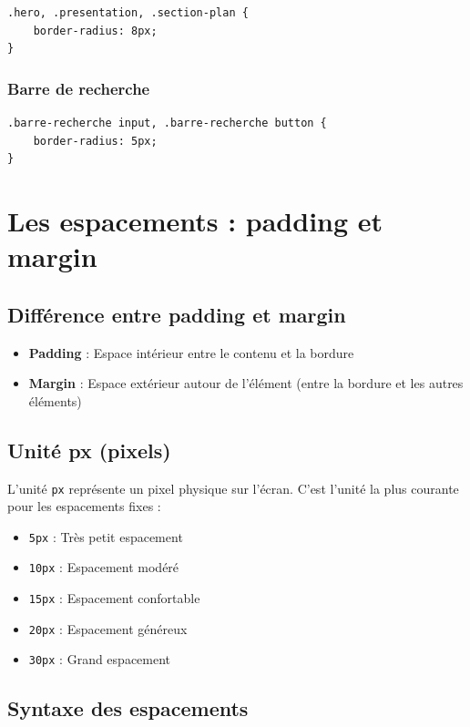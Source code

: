 \documentclass[12pt,a4paper]{article}
\begin{document}
\begin{lstlisting}[style=CSS]
.hero, .presentation, .section-plan {
    border-radius: 8px;
}
\end{lstlisting}

\subsubsection{Barre de recherche}

\begin{lstlisting}[style=CSS]
.barre-recherche input, .barre-recherche button {
    border-radius: 5px;
}
\end{lstlisting}

\section{Les espacements : padding et margin}

\subsection{Différence entre padding et margin}

\begin{itemize}
\item \textbf{Padding} : Espace intérieur entre le contenu et la bordure
\item \textbf{Margin} : Espace extérieur autour de l'élément (entre la bordure et les autres éléments)
\end{itemize}

\subsection{Unité px (pixels)}

L'unité \texttt{px} représente un pixel physique sur l'écran. C'est l'unité la plus courante pour les espacements fixes :

\begin{itemize}
\item \texttt{5px} : Très petit espacement
\item \texttt{10px} : Espacement modéré
\item \texttt{15px} : Espacement confortable
\item \texttt{20px} : Espacement généreux
\item \texttt{30px} : Grand espacement
\end{itemize}

\subsection{Syntaxe des espacements}
\end{document}
